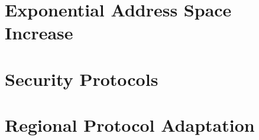 \section{Exponential Address Space Increase}

\section{Security Protocols}

\section{Regional Protocol Adaptation}
